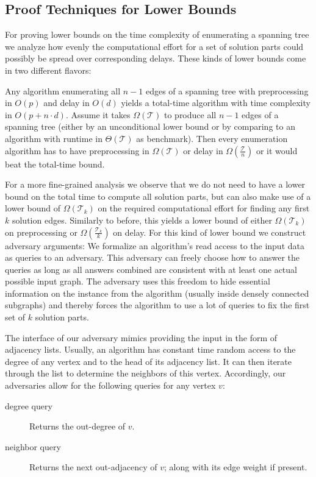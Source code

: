 \documentclass[a4paper, USenglish, cleveref, autoref, thm-restate]{lipics-v2021}
\newcommand{\totaltime}{\mathcal{T}}
\newcommand{\prefixtime}{\mathcal{T}_k}
\begin{document}
\subsection{Proof Techniques for Lower Bounds}
\label{subsec:lower-techniques}

For proving lower bounds on the time complexity of enumerating a spanning tree we analyze how evenly the computational effort for a set of solution parts could possibly be spread over corresponding delays.
These kinds of lower bounds come in two different flavors:

Any algorithm enumerating all $n-1$ edges of a spanning tree with preprocessing in $O(p)$ and delay in $O(d)$ yields a total-time algorithm with time complexity in $O(p + n \cdot d)$.
Assume it takes $\Omega(\totaltime)$ to produce all $n-1$ edges of a spanning tree (either by an unconditional lower bound or by comparing to an algorithm with runtime in $\Theta(\totaltime)$ as benchmark).
Then every enumeration algorithm has to have preprocessing in $\Omega(\totaltime)$ or delay in $\Omega(\frac{\totaltime}{n})$ or it would beat the total-time bound.

For a more fine-grained analysis we observe that we do not need to have a lower bound on the total time to compute all solution parts, but can also make use of a lower bound of $\Omega(\prefixtime)$ on the required computational effort for finding any first $k$ solution edges.
Similarly to before, this yields a lower bound of either $\Omega(\prefixtime)$ on preprocessing or $\Omega(\frac{\prefixtime}{k})$ on delay.
For this kind of lower bound we construct adversary arguments:
We formalize an algorithm's read access to the input data as queries to an adversary.
This adversary can freely choose how to answer the queries as long as all answers combined are consistent with at least one actual possible input graph.
The adversary uses this freedom to hide essential information on the instance from the algorithm (usually inside densely connected subgraphs) and thereby forces the algorithm to use a lot of queries to fix the first set of $k$ solution parts.

The interface of our adversary mimics providing the input in the form of adjacency lists.
Usually, an algorithm has constant time random access to the degree of any vertex and to the head of its adjacency list.
It can then iterate through the list to determine the neighbors of this vertex.
Accordingly, our adversaries allow for the following queries for any vertex $v$:
\begin{description}
	\item[degree query] Returns the out-degree of $v$.
	\item[neighbor query] Returns the next out-adjacency of $v$; along with its edge weight if present.
\end{description}
\end{document}
